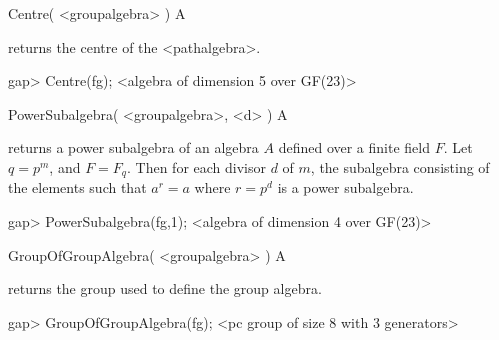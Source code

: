 \>Centre( <groupalgebra> ) A

returns the centre of the <pathalgebra>.

\beginexample
gap> Centre(fg);
<algebra of dimension 5 over GF(23)>
\endexample


\>PowerSubalgebra( <groupalgebra>, <d> ) A

returns a power subalgebra of an
algebra $A$ defined over a finite field $F$. Let $q = p^m$, and $F =
F_q$. Then for each divisor $d$ of $m$, the subalgebra consisting of
the elements such that $a^r = a$ where $r = p^d$ is a power
subalgebra.


\beginexample
gap> PowerSubalgebra(fg,1);
<algebra of dimension 4 over GF(23)>
\endexample

\>GroupOfGroupAlgebra( <groupalgebra> ) A

returns the group used to define the group algebra.


\beginexample
gap> GroupOfGroupAlgebra(fg);
<pc group of size 8 with 3 generators>
\endexample
